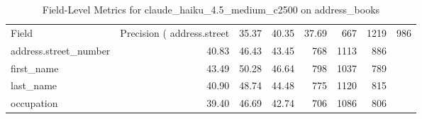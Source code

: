 \begin{table}
\caption{Field-Level Metrics for claude_haiku_4.5_medium_c2500 on address_books}
\label{tab:fields_claude_haiku_4.5_medium_c2500_address_books}
\begin{tabular}{lrrrrrr}
\toprule
Field & Precision (%
\midrule
address.street & 35.37 & 40.35 & 37.69 & 667 & 1219 & 986 \\
address.street_number & 40.83 & 46.43 & 43.45 & 768 & 1113 & 886 \\
first_name & 43.49 & 50.28 & 46.64 & 798 & 1037 & 789 \\
last_name & 40.90 & 48.74 & 44.48 & 775 & 1120 & 815 \\
occupation & 39.40 & 46.69 & 42.74 & 706 & 1086 & 806 \\
\bottomrule
\end{tabular}
\end{table}
